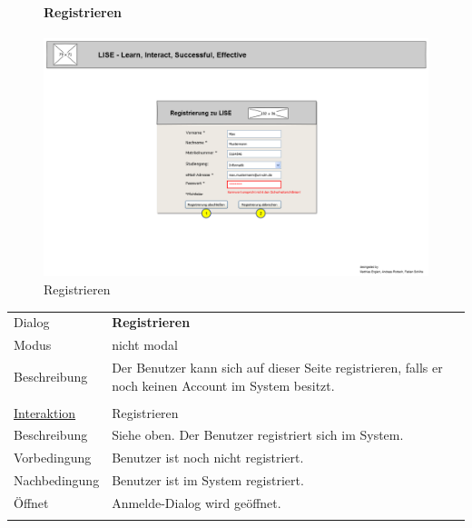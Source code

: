 \documentclass[12pt,a4paper]{article}
\begin{document}
{\begin{figure}[H]
	\paragraph{Registrieren}
	\includegraphics[width=\textwidth]{Bilder/Mockups/GUI/Registrierung.png}
	\caption{Registrieren}
	\label{GuiRegistrieren}
\end{figure}
\begin{tabular}{l p{12cm}}
	Dialog 	 & \textbf{Registrieren} \\ 
	Modus & nicht modal\\ 
	Beschreibung   	 & Der Benutzer kann sich auf dieser Seite registrieren, falls er noch keinen Account im System besitzt. \\\\
	
	\underline{Interaktion} 	 & Registrieren\\ 
	Beschreibung   	 & Siehe oben. Der Benutzer registriert sich im System.\\
	Vorbedingung	& Benutzer ist noch nicht registriert.\\
	Nachbedingung	& Benutzer ist im System registriert. \\
	Öffnet			& Anmelde-Dialog wird geöffnet.\\\\

\end{tabular}\\\\

\begin{figure}[H]
	\centering

\end{figure}}
\end{document}
